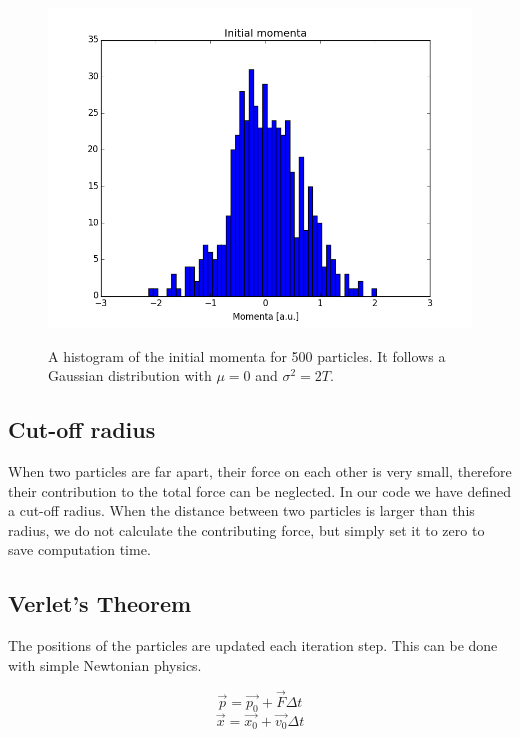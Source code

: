 \documentclass[a4paper,twoside,12pt]{article}
\begin{document}
\begin{figure}
\centering
\includegraphics[scale=0.6]{figures/initial_momenta_500.png}
\label{fig:ini_mom_500}
\caption{A histogram of the initial momenta for 500 particles. It follows a Gaussian distribution with $\mu=0$ and $\sigma^{2}=2T$.}
\end{figure}

\subsection{Cut-off radius}

\noindent When two particles are far apart, their force on each other is very small, therefore their contribution to the total force can be neglected. In our code we have defined a cut-off radius. When the distance between two particles is larger than this radius, we do not calculate the contributing force, but simply set it to zero to save computation time. 

\subsection{Verlet's Theorem}\label{sec:verlet}

The positions of the particles are updated each iteration step. This can be done with simple Newtonian physics.

\begin{equation}
\vec{p} =\vec{p_0}+\vec{F}\Delta t 
\end{equation}
\begin{equation}
\vec{x}=\vec{x_0}+\vec{v_0}\Delta t
\end{equation}
\end{document}
